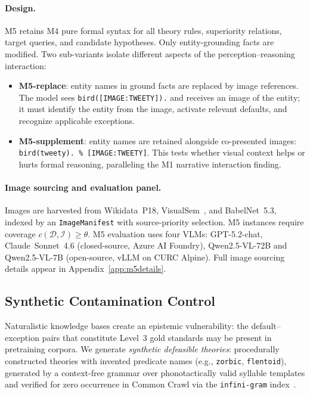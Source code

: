 \documentclass{article}
\theoremstyle{definition}
\newcommand{\D}{\mathcal{D}}
\begin{document}
\paragraph{Design.} M5 retains M4 pure formal syntax for all theory rules, superiority relations, target queries, and candidate hypotheses. Only entity-grounding facts are modified. Two sub-variants isolate different aspects of the perception--reasoning interaction:
\begin{itemize}[nosep]
\item \textbf{M5-replace}: entity names in ground facts are replaced by image references. The model sees \texttt{bird([IMAGE:TWEETY]).} and receives an image of the entity; it must identify the entity from the image, activate relevant defaults, and recognize applicable exceptions.
\item \textbf{M5-supplement}: entity names are retained alongside co-presented images: \texttt{bird(tweety). \% [IMAGE:TWEETY]}. This tests whether visual context helps or hurts formal reasoning, paralleling the M1 narrative interaction finding.
\end{itemize}

\paragraph{Image sourcing and evaluation panel.} Images are harvested from Wikidata~P18, VisualSem~\cite{geigle2024babelimagenet}, and BabelNet~5.3, indexed by an \texttt{ImageManifest} with source-priority selection. M5 instances require coverage $c(\D, \mathcal{I}) \geq \theta$. M5 evaluation uses four VLMs: GPT-5.2-chat, Claude~Sonnet~4.6 (closed-source, Azure AI Foundry), Qwen2.5-VL-72B and Qwen2.5-VL-7B (open-source, vLLM on CURC Alpine). Full image sourcing details appear in Appendix~\ref{app:m5details}.


\subsection{Synthetic Contamination Control}\label{subsec:synthetic}

Naturalistic knowledge bases create an epistemic vulnerability: the default--exception pairs that constitute Level~3 gold standards may be present in pretraining corpora. We generate \emph{synthetic defeasible theories}: procedurally constructed theories with invented predicate names (e.g., \texttt{zorbic}, \texttt{flentoid}), generated by a context-free grammar over phonotactically valid syllable templates and verified for zero occurrence in Common Crawl via the \texttt{infini-gram} index~\cite{liu2024infini}.
\end{document}
